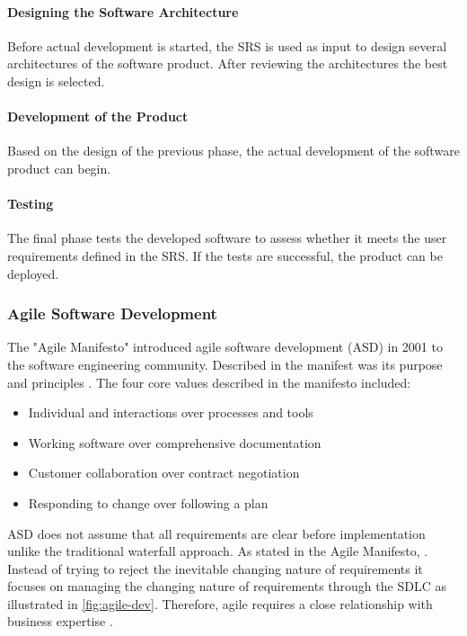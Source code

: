 \paragraph{Designing the Software Architecture}
Before actual development is started, the SRS is used as input to design several architectures of the software product. After reviewing the architectures the best design is selected. 

\paragraph{Development of the Product}
Based on the design of the previous phase, the actual development of the software product can begin.

\paragraph{Testing}
The final phase tests the developed software to assess whether it meets the user requirements defined in the SRS. If the tests are successful, the product can be deployed.

\subsubsection{Agile Software Development}
The "Agile Manifesto" introduced agile software development (ASD) in 2001 to the software engineering community. Described in the manifest was its purpose and principles \cite{fowler2001agile}. The four core values described in the manifesto included:

\begin{itemize}
    \item Individual and interactions over processes and tools
    \item Working software over comprehensive documentation
    \item Customer collaboration over contract negotiation
    \item Responding to change over following a plan
\end{itemize}

ASD does not assume that all requirements are clear before implementation unlike the traditional waterfall approach. As stated in the Agile Manifesto,  \cite{fowler2001agile}. Instead of trying to reject the inevitable changing nature of requirements it focuses on managing the changing nature of requirements through the SDLC as illustrated in \ref{fig:agile-dev}. Therefore, agile requires a close relationship with business expertise \cite{Shah_2016}. 

